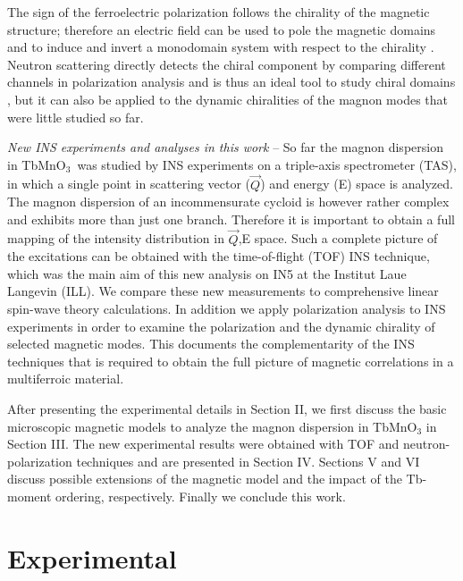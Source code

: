 \documentclass[aps,prb,twocolumn,superscriptaddress,showpacs,floatfix]{revtex4-2}
\newcommand{\tbmno}{TbMnO$_3$}
\begin{document}
The sign of the ferroelectric polarization follows the chirality of the magnetic structure; therefore an electric field can be used to
pole the magnetic domains and to induce and invert a monodomain system with respect to the chirality \cite{Yamasaki2007,Finger2010,Poole2009,Hearmon2012,Finger2010,Stein2017}.
Neutron scattering directly detects the chiral component by comparing different channels in polarization analysis \cite{Brown2006} and is thus an ideal tool to study chiral domains \cite{Stein2021}, but it can
also be applied to the dynamic chiralities of the magnon modes that were little studied so far. 

{\it New INS experiments and analyses in this work} --
So far the magnon dispersion in \tbmno \ was studied by INS experiments on a triple-axis spectrometer (TAS),
in which a single point in scattering vector ($\vec{Q}$) and energy (E) space is analyzed.
The magnon dispersion of an incommensurate cycloid is however rather complex and exhibits more than just one branch.
Therefore it is important to obtain a full mapping of the intensity distribution in $\vec{Q}$,E  space.
Such a complete picture of the excitations can be obtained with the time-of-flight (TOF) INS
technique, which was the main aim of this new analysis on IN5 at the Institut Laue Langevin (ILL).
We compare these new measurements to comprehensive linear spin-wave theory calculations.
In addition we apply polarization analysis to INS experiments in order to examine
the polarization and the dynamic chirality of selected magnetic modes. This documents the complementarity
of the  INS techniques that is required to obtain the full picture of magnetic correlations in a
multiferroic material.

After presenting the experimental details in Section II, we first discuss the basic microscopic magnetic models
to analyze the magnon dispersion in TbMnO$_3$ in Section III. The new experimental results were obtained  with TOF and neutron-polarization techniques and are presented in Section IV. Sections V and VI discuss possible extensions of the magnetic model and the impact of the Tb-moment ordering, respectively. Finally we conclude
this work.


\section{Experimental}
\end{document}
